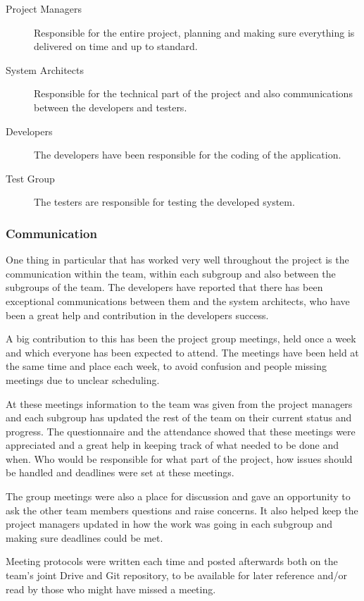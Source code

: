 \documentclass[a4paper]{article}
\begin{document}
\begin{description}
\item[Project Managers] Responsible for the entire project, planning and making sure everything is delivered on time and up to standard.
\item[System Architects] Responsible for the technical part of the project and also communications between the developers and testers.
\item[Developers] The developers have been responsible for the coding of the application.
\item[Test Group] The testers are responsible for testing the developed system.
\end{description}



\subsubsection{Communication}
One thing in particular that has worked very well throughout the project is the communication within the team, within each subgroup and also between the subgroups of the team. The developers have reported that there has been exceptional communications between them and the system architects, who have been a great help and contribution in the developers success.

A big contribution to this has been the project group meetings, held once a week and which everyone has been expected to attend. The meetings have been held at the same time and place each week, to avoid confusion and people missing meetings due to unclear scheduling. 

At these meetings information to the team was given from the project managers and each subgroup has updated the rest of the team on their current status and progress. The questionnaire and the attendance showed that these meetings were appreciated and a great help in keeping track of what needed to be done and when. Who would be responsible for what part of the project, how issues should be handled and deadlines were set at these meetings.

The group meetings were also a place for discussion and gave an opportunity to ask the other team members questions and raise concerns. It also helped keep the project managers updated in how the work was going in each subgroup and making sure deadlines could be met.

Meeting protocols were written each time and posted afterwards both on the team's joint Drive and Git repository, to be available for later reference and/or read by those who might have missed a meeting.
\end{document}
